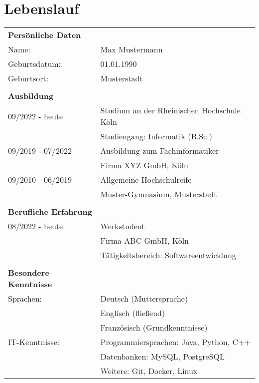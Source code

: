 \chapter*{Lebenslauf}

\begin{tabular}{p{}p{}}
\textbf{Persönliche Daten} & \\
Name: & Max Mustermann \\
Geburtsdatum: & 01.01.1990 \\
Geburtsort: & Musterstadt \\
\\
\textbf{Ausbildung} & \\
09/2022 - heute & Studium an der Rheinischen Hochschule Köln \\
 & Studiengang: Informatik (B.Sc.) \\
09/2019 - 07/2022 & Ausbildung zum Fachinformatiker \\
 & Firma XYZ GmbH, Köln \\
09/2010 - 06/2019 & Allgemeine Hochschulreife \\
 & Muster-Gymnasium, Musterstadt \\
\\
\textbf{Berufliche Erfahrung} & \\
08/2022 - heute & Werkstudent \\
 & Firma ABC GmbH, Köln \\
 & Tätigkeitsbereich: Softwareentwicklung \\
\\
\textbf{Besondere Kenntnisse} & \\
Sprachen: & Deutsch (Muttersprache) \\
 & Englisch (fließend) \\
 & Französisch (Grundkenntnisse) \\
IT-Kenntnisse: & Programmiersprachen: Java, Python, C++ \\
 & Datenbanken: MySQL, PostgreSQL \\
 & Weitere: Git, Docker, Linux \\
\end{tabular}